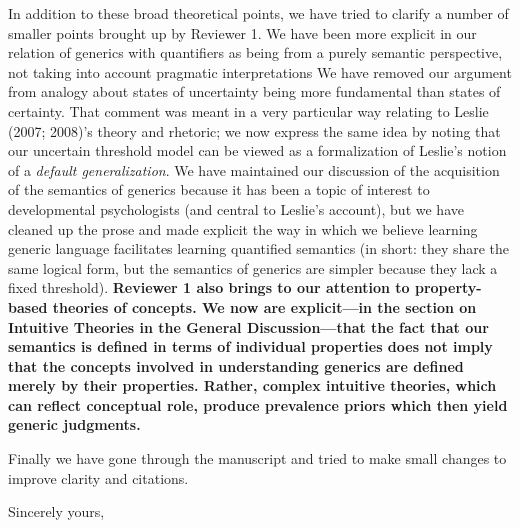 \documentclass[11pt,letterpaper]{letter} %
\newcommand{\ndg}[1]{{\color{green}{[ndg: #1]}}}
\newcommand{\mht}[1]{{\color{blue}{[mht: #1]}}}
\begin{document}
\begin{letter}
In addition to these broad theoretical points, we have tried to clarify a number of smaller points brought up by Reviewer 1.
We have been more explicit in our relation of generics with quantifiers as being from a purely semantic perspective, not taking into account pragmatic interpretations
We have removed our argument from analogy about states of uncertainty being more fundamental than states of certainty.
That comment was meant in a very particular way relating to Leslie (2007; 2008)'s theory and rhetoric; we now express the same idea by noting that our uncertain threshold model can be viewed as a formalization of Leslie's notion of a \emph{default generalization}. 
We have maintained our discussion of the acquisition of the semantics of generics because it has been a topic of interest to developmental psychologists (and central to Leslie's account), but we have cleaned up the prose and made explicit the way in which we believe learning generic language facilitates learning quantified semantics (in short: they share the same logical form, but the semantics of generics are simpler because they lack a fixed threshold).
\textbf{Reviewer 1 also brings to our attention to property-based theories of concepts. We now are explicit---in the section on Intuitive Theories in the General Discussion---that the fact that our semantics is defined in terms of individual properties does not imply that the concepts involved in understanding generics are defined merely by their properties. Rather, complex intuitive theories, which can reflect conceptual role, produce prevalence priors which then yield generic judgments.}

Finally we have gone through the manuscript and tried to make small changes to improve clarity and citations.



\closing{Sincerely yours,}

\end{letter}
\end{document}

